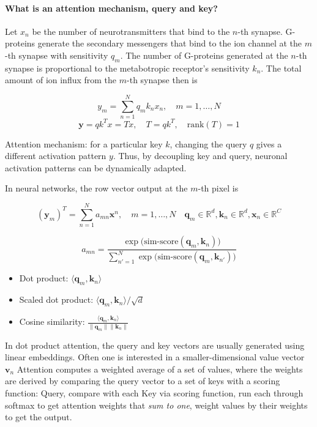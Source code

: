 \paragraph{What is an attention mechanism, query and key?}

Let $x_n$ be the number of neurotransmitters that bind to the $n$-th synapse.
G-proteins generate the secondary messengers that bind to the ion channel at the $m$-th synapse with sensitivity $q_m$.
The number of G-proteins generated at the $n$-th synapse is proportional to the metabotropic receptor's sensitivity $k_n$.
The total amount of ion influx from the $m$-th synapse then is

$$y_m = \sum_{n=1}^N{q_m k_n x_n}, \quad m = 1, \dots, N$$
$$\bm{y} = q k^T x = T x, \quad T = q k^T, \quad \text{rank}(T) = 1$$

Attention mechanism:
for a particular key $k$, changing the query $q$ gives a different activation pattern $y$.
Thus, by decoupling key and query, neuronal activation patterns can be dynamically adapted.

In neural networks, the row vector output at the $m$-th pixel is

$$
(\bm{y}_m)^T = \sum_{n=1}^N{a_{mn} \bm{x}^n}, \quad m = 1, \dots, N \quad
\bm{q}_m \in \mathbb{R}^d, \bm{k}_n \in \mathbb{R}^d, \bm{x}_n \in \mathbb{R}^C
$$

$$
a_{mn} = \frac{\exp\big( \text{sim-score}(\bm{q}_m, \bm{k}_n) \big)}{ \sum_{n' = 1}^N{\exp\big( \text{sim-score}(\bm{q}_m, \bm{k}_{n'}) \big)} }
$$

\begin{itemize}
    \item Dot product: $\langle \bm{q}_m, \bm{k}_n \rangle$
    \item Scaled dot product: $\langle \bm{q}_m, \bm{k}_n \rangle / \sqrt{d}$
    \item Cosine similarity: $\frac{\langle \bm{q}_m, \bm{k}_n \rangle}{\lVert \bm{q}_m \rVert \lVert \bm{k}_n \rVert}$
\end{itemize}

In dot product attention, the query and key vectors are usually generated using linear embeddings.
Often one is interested in a smaller-dimensional value vector $\bm{v}_n$
Attention computes a weighted average of a set of values,
where the weights are derived by comparing the query vector to a set of keys with a scoring function:
Query, compare with each Key via scoring function, run each through softmax to get attention weights that \textit{sum to one},
weight values by their weights to get the output.

